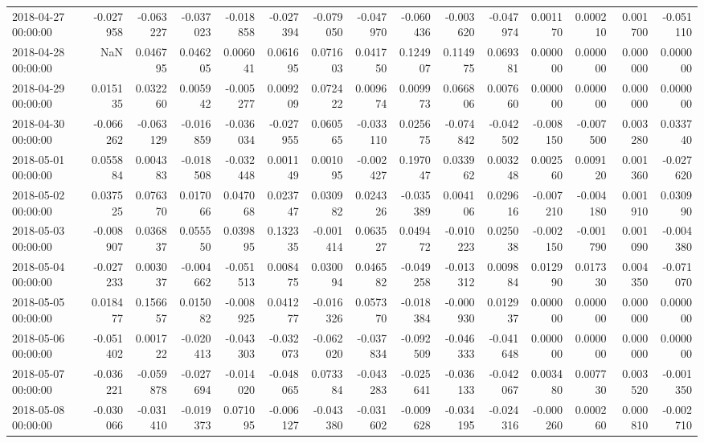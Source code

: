 \begin{tabular}{lrrrrrrrrrrrrrr}
2018-04-27 00:00:00 & -0.027958 & -0.063227 & -0.037023 & -0.018858 & -0.027394 & -0.079050 & -0.047970 & -0.060436 & -0.003620 & -0.047974 & 0.001170 & 0.000210 & 0.001700 & -0.051110 \\
2018-04-28 00:00:00 & NaN & 0.046795 & 0.046205 & 0.006041 & 0.061695 & 0.071603 & 0.041750 & 0.124907 & 0.114975 & 0.069381 & 0.000000 & 0.000000 & 0.000000 & 0.000000 \\
2018-04-29 00:00:00 & 0.015135 & 0.032260 & 0.005942 & -0.005277 & 0.009209 & 0.072422 & 0.009674 & 0.009973 & 0.066806 & 0.007660 & 0.000000 & 0.000000 & 0.000000 & 0.000000 \\
2018-04-30 00:00:00 & -0.066262 & -0.063129 & -0.016859 & -0.036034 & -0.027955 & 0.060565 & -0.033110 & 0.025675 & -0.074842 & -0.042502 & -0.008150 & -0.007500 & 0.003280 & 0.033740 \\
2018-05-01 00:00:00 & 0.055884 & 0.004383 & -0.018508 & -0.032448 & 0.001149 & 0.001095 & -0.002427 & 0.197047 & 0.033962 & 0.003248 & 0.002560 & 0.009120 & 0.001360 & -0.027620 \\
2018-05-02 00:00:00 & 0.037525 & 0.076370 & 0.017066 & 0.047068 & 0.023747 & 0.030982 & 0.024326 & -0.035389 & 0.004106 & 0.029616 & -0.007210 & -0.004180 & 0.001910 & 0.030990 \\
2018-05-03 00:00:00 & -0.008907 & 0.036837 & 0.055550 & 0.039895 & 0.132335 & -0.001414 & 0.063527 & 0.049472 & -0.010223 & 0.025038 & -0.002150 & -0.001790 & 0.001090 & -0.004380 \\
2018-05-04 00:00:00 & -0.027233 & 0.003037 & -0.004662 & -0.051513 & 0.008475 & 0.030094 & 0.046582 & -0.049258 & -0.013312 & 0.009884 & 0.012990 & 0.017330 & 0.004350 & -0.071070 \\
2018-05-05 00:00:00 & 0.018477 & 0.156657 & 0.015082 & -0.008925 & 0.041277 & -0.016326 & 0.057370 & -0.018384 & -0.000930 & 0.012937 & 0.000000 & 0.000000 & 0.000000 & 0.000000 \\
2018-05-06 00:00:00 & -0.051402 & 0.001722 & -0.020413 & -0.043303 & -0.032073 & -0.062020 & -0.037834 & -0.092509 & -0.046333 & -0.041648 & 0.000000 & 0.000000 & 0.000000 & 0.000000 \\
2018-05-07 00:00:00 & -0.036221 & -0.059878 & -0.027694 & -0.014020 & -0.048065 & 0.073384 & -0.043283 & -0.025641 & -0.036133 & -0.042067 & 0.003480 & 0.007730 & 0.003520 & -0.001350 \\
2018-05-08 00:00:00 & -0.030066 & -0.031410 & -0.019373 & 0.071095 & -0.006127 & -0.043380 & -0.031602 & -0.009628 & -0.034195 & -0.024316 & -0.000260 & 0.000260 & 0.000810 & -0.002710 \\

\end{tabular}
